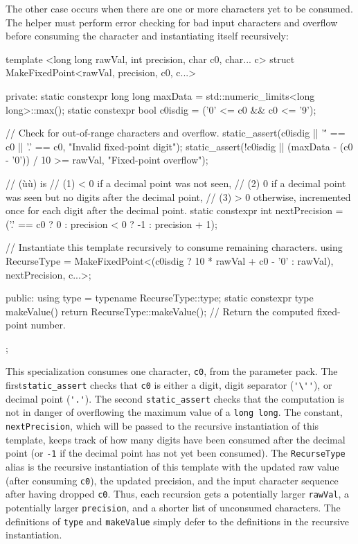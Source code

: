 \noindent The other case occurs when there are one or more characters yet to be
consumed. The helper must perform error checking for bad input
characters and overflow before consuming the character and instantiating
itself recursively:

\begin{emcppslisting}[emcppsbatch=e17]
template <long long rawVal, int precision, char c0, char... c>
struct MakeFixedPoint<rawVal, precision, c0, c...>
{
private:
    static constexpr long long maxData = std::numeric_limits<long long>::max();
    static constexpr bool      c0isdig = ('0' <= c0 && c0 <= '9');

    // Check for out-of-range characters and overflow.
    static_assert(c0isdig || '\'' == c0 || '.' == c0,
                  "Invalid fixed-point digit");
    static_assert(!c0isdig || (maxData - (c0 - '0')) / 10 >= rawVal,
                  "Fixed-point overflow");

    // (ù{}ù) is
    // (1) < 0 if a decimal point was not seen,
    // (2) 0   if a decimal point was seen but no digits after the decimal point,
    // (3) > 0 otherwise, incremented once for each digit after the decimal point.
    static constexpr int nextPrecision = ('.' == c0     ?  0 :
                                          precision < 0 ? -1 :
                                          precision + 1);

    // Instantiate this template recursively to consume remaining characters.
    using RecurseType = MakeFixedPoint<(c0isdig ? 10 * rawVal + c0 - '0' :
                                        rawVal), nextPrecision, c...>;

public:
    using                 type = typename RecurseType::type;
    static constexpr type makeValue() { return RecurseType::makeValue(); }
        // Return the computed fixed-point number.
};
\end{emcppslisting}

\noindent This specialization consumes one character, \lstinline!c0!, from the
parameter pack. The first\linebreak[4]%
\lstinline!static_assert! checks that
\lstinline!c0! is either a digit, digit separator
(\lstinline!'\''!),
or decimal point (\lstinline!'.'!). The second
\lstinline!static_assert! checks that the computation is not in danger of
overflowing the maximum value of a \lstinline!long!~\lstinline!long!. The
constant, \lstinline!nextPrecision!, which will be passed to the recursive
instantiation of this template, keeps track of how many digits have been
consumed after the decimal point (or \lstinline!-1! if the decimal point has not yet
been consumed). The \lstinline!RecurseType! alias is the recursive
instantiation of this template with the updated raw value (after
consuming \lstinline!c0!), the updated precision, and the input character
sequence after having dropped \lstinline!c0!. Thus, each recursion gets a
potentially larger \lstinline!rawVal!, a potentially larger
\lstinline!precision!, and a shorter list of unconsumed characters. The
definitions of \lstinline!type! and \lstinline!makeValue! simply defer to the
definitions in the recursive instantiation.

